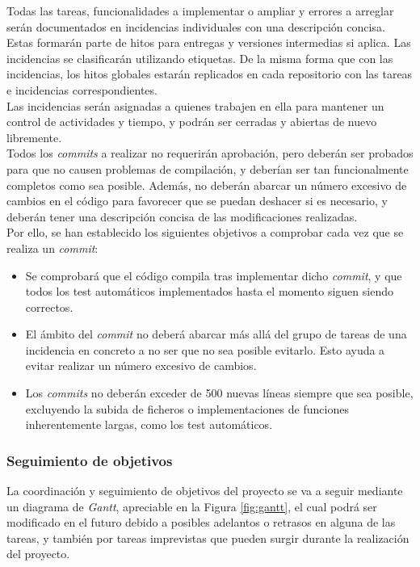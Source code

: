 \documentclass[11pt, a4paper, titlepage]{article}
\begin{document}
Todas las tareas, funcionalidades a implementar o ampliar y errores a arreglar serán documentados en incidencias individuales con una descripción concisa. Estas formarán parte de hitos para entregas y versiones intermedias si aplica. Las incidencias se clasificarán utilizando etiquetas. De la misma forma que con las incidencias, los hitos globales estarán replicados en cada repositorio con las tareas e incidencias correspondientes. \\

Las incidencias serán asignadas a quienes trabajen en ella para mantener un control de actividades y tiempo, y podrán ser cerradas y abiertas de nuevo libremente. \\

Todos los \textit{commits} a realizar no requerirán aprobación, pero deberán ser probados para que no causen problemas de compilación, y deberían ser tan funcionalmente completos como sea posible. Además, no deberán abarcar un número excesivo de cambios en el código para favorecer que se puedan deshacer si es necesario, y deberán tener una descripción concisa de las modificaciones realizadas. \\

Por ello, se han establecido los siguientes objetivos a comprobar cada vez que se realiza un \textit{commit}:
\begin{itemize}
    \item Se comprobará que el código compila tras implementar dicho \textit{commit}, y que todos los test automáticos implementados hasta el momento siguen siendo correctos.
    \item El ámbito del \textit{commit} no deberá abarcar más allá del grupo de tareas de una incidencia en concreto a no ser que no sea posible evitarlo. Esto ayuda a evitar realizar un número excesivo de cambios.
    \item Los \textit{commits} no deberán exceder de 500 nuevas líneas siempre que sea posible, excluyendo la subida de ficheros o implementaciones de funciones inherentemente largas, como los test automáticos.
\end{itemize}


\subsubsection{Seguimiento de objetivos}
La coordinación y seguimiento de objetivos del proyecto se va a seguir mediante un diagrama de \textit{Gantt}, apreciable en la Figura \ref{fig:gantt}, el cual podrá ser modificado en el futuro debido a posibles adelantos o retrasos en alguna de las tareas, y también por tareas imprevistas que pueden surgir durante la realización del proyecto.\\
\end{document}
